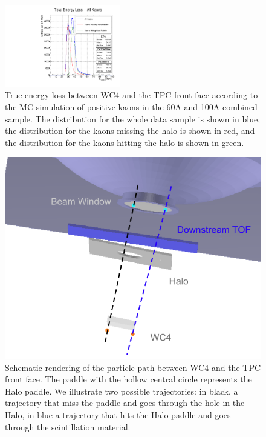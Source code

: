 \begin{figure}[hbpt]
\centering
\includegraphics[width=0.45\textwidth]{Chapter-5/Images/ELossKaons.pdf}
\caption{True energy loss between WC4 and the TPC front face according to the MC simulation of positive kaons in the 60A and 100A combined sample. The distribution for the whole data sample is shown in blue, the distribution for the kaons missing the halo is shown in red, and the distribution for the kaons hitting the halo is shown in green.  }
\label{fig:ELossKaons}
\end{figure}




\begin{figure}[hbpt]
\centering
\includegraphics[scale=0.5]{Chapter-5/Images/Halo.png}
\caption{Schematic rendering of the particle path between WC4 and the TPC front face. The paddle with the hollow central circle represents the Halo paddle. We illustrate two possible trajectories: in black, a trajectory that miss the paddle and goes through the hole in the Halo, in blue a trajectory that hits the Halo paddle and goes through the scintillation material.}
\label{fig:Halo}
\end{figure}




